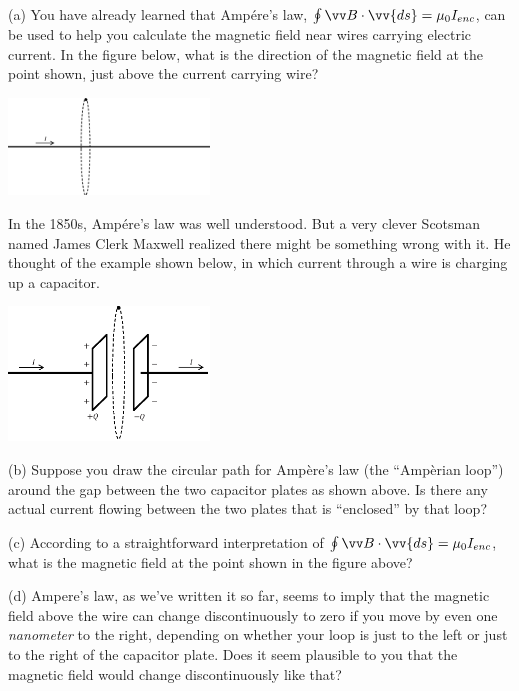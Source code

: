 (a) You have already learned that Amp\'ere's law, $\oint \vv B \cdot \vv{ds} = \mu_0I_{enc}$, can be used to help you calculate the magnetic field near wires carrying electric current.  In the figure below, what is the direction of the magnetic field at the point shown, just above the current carrying wire?

\begin{center}
    \includegraphics[width=0.4\textwidth]{deriving_em_waves/wire_and_loop.eps}
\end{center}

In the 1850s, Amp\'ere's law was well understood.  But a very clever Scotsman named James Clerk Maxwell realized there might be something wrong with it.  He thought of the example shown below, in which current through a wire is charging up a capacitor.
\begin{center}
    \includegraphics[width=0.4\textwidth]{deriving_em_waves/capacitor_and_loop.eps}
\end{center}

(b) Suppose you draw the circular path for Amp\`ere's law (the ``Amp\`erian loop'') around the gap between the two capacitor plates as shown above.  Is there any actual current flowing between the two plates that is ``enclosed'' by that loop?   
\vspace{0.5in}

(c) According to a straightforward interpretation of $\oint \vv B \cdot \vv{ds} = \mu_0I_{enc}$, what is the magnetic field at the point shown in the figure above?  
\vspace{0.4in}

(d) Ampere's law, as we've written it so far, seems to imply that the magnetic field above the wire can change discontinuously to zero if you move by even one \textit{nanometer} to the right, depending on whether your loop is just to the left or just to the right of the capacitor plate.  Does it seem plausible to you that the magnetic field would change discontinuously like that?
\vspace{0.5in}

